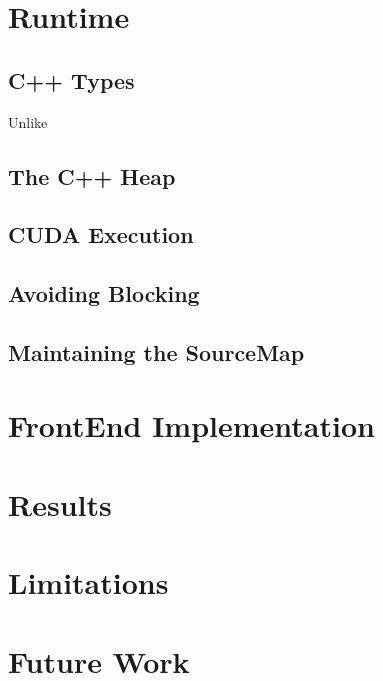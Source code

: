 \documentclass[nocopyrightspace]{sigchi}
\begin{document}
\section{Runtime}


\subsection{C++ Types}

Unlike

\subsection{The C++ Heap}

\subsection{CUDA Execution}


\subsection{Avoiding Blocking}

\subsection{Maintaining the SourceMap}


\section{FrontEnd Implementation}



\section{Results}



\section{Limitations}

\section{Future Work}



\end{document}
